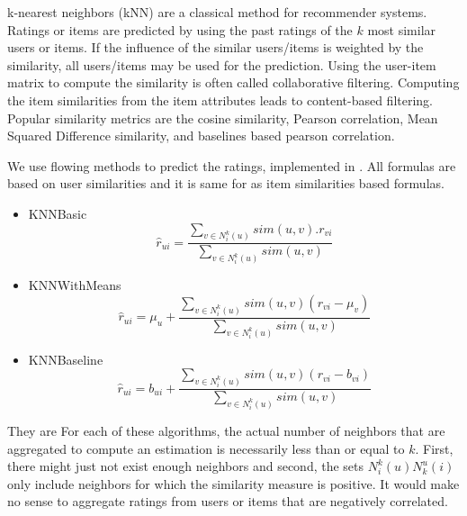 
k-nearest neighbors (kNN) are a classical method for recommender systems. Ratings or items are predicted by using the past ratings of the $k$ most similar users or items. If the influence of the similar users/items is weighted by the similarity, all users/items may be used for the prediction. Using the user-item matrix to compute the similarity is often called collaborative filtering. Computing the item similarities from the item attributes leads to content-based filtering. Popular similarity metrics are the cosine similarity, Pearson correlation, Mean Squared Difference similarity, and baselines based pearson correlation. 

We use flowing methods to predict the ratings, implemented in \cite{surprise}. All formulas are based on user similarities and it is same for as item similarities based formulas.
\begin{itemize}
\item KNNBasic
$$\hat{r}_{ui}=\frac{\sum_{v \in N_i^k(u)} sim(u,v).r_{vi}}{\sum_{v \in N_i^k(u)} sim(u,v)}$$

\item KNNWithMeans
$$\hat{r}_{ui}=\mu_u+\frac{\sum_{v \in N_i^k(u)} sim(u,v)(r_{vi}-\mu_v)}{\sum_{v \in N_i^k(u)} sim(u,v)}$$

\item KNNBaseline
$$\hat{r}_{ui}=b_{ui}+\frac{\sum_{v \in N_i^k(u)} sim(u,v)(r_{vi}-b_{vi})}{\sum_{v \in N_i^k(u)} sim(u,v)}$$
\end{itemize}
They are For each of these algorithms, the actual number of neighbors that are aggregated to compute an estimation is necessarily less than or equal to $k$. First, there might just not exist enough neighbors and second, the sets $N_i^k(u) N_k^u(i)$ only include neighbors for which the similarity measure is positive. It would make no sense to aggregate ratings from users or items that are negatively correlated. 
